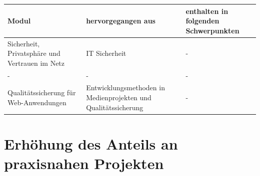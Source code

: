 \begin{longtable}[]{@{}lll@{}}
\toprule
\begin{minipage}[b]{0.33\columnwidth}\raggedright\strut
Modul\strut
\end{minipage} & \begin{minipage}[b]{0.33\columnwidth}\raggedright\strut
hervorgegangen aus\strut
\end{minipage} & \begin{minipage}[b]{0.33\columnwidth}\raggedright\strut
enthalten in folgenden Schwerpunkten\strut
\end{minipage}\tabularnewline
\midrule
\endhead
\begin{minipage}[t]{0.33\columnwidth}\raggedright\strut
Sicherheit, Privatsphäre und Vertrauen im Netz\strut
\end{minipage} & \begin{minipage}[t]{0.33\columnwidth}\raggedright\strut
IT Sicherheit\strut
\end{minipage} & \begin{minipage}[t]{0.33\columnwidth}\raggedright\strut
-\strut
\end{minipage}\tabularnewline
\begin{minipage}[t]{0.33\columnwidth}\raggedright\strut
-\strut
\end{minipage} & \begin{minipage}[t]{0.33\columnwidth}\raggedright\strut
-\strut
\end{minipage} & \begin{minipage}[t]{0.33\columnwidth}\raggedright\strut
-\strut
\end{minipage}\tabularnewline
\begin{minipage}[t]{0.33\columnwidth}\raggedright\strut
Qualitätssicherung für Web-Anwendungen\strut
\end{minipage} & \begin{minipage}[t]{0.33\columnwidth}\raggedright\strut
Entwicklungsmethoden in Medienprojekten und Qualitätssicherung\strut
\end{minipage} & \begin{minipage}[t]{0.33\columnwidth}\raggedright\strut
-\strut
\end{minipage}\tabularnewline
\bottomrule
\end{longtable}

\section{Erhöhung des Anteils an praxisnahen
Projekten}\label{erhuxf6hung-des-anteils-an-praxisnahen-projekten}


